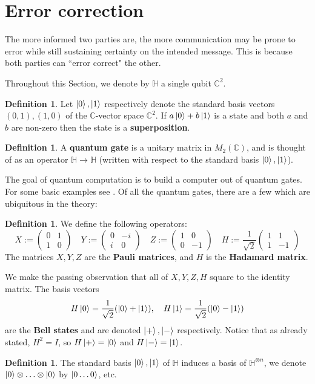 \documentclass[12pt]{article}
\theoremstyle{plain}
\theoremstyle{definition}
\newtheorem{defn}[thm]{Definition} %
\newcommand{\bb}[1]{\mathbb{#1}}
\newcommand{\lto}{\longrightarrow}
\begin{document}
	\section{Error correction}
	The more informed two parties are, the more communication may be prone to error while still sustaining certainty on the intended message. This is because both parties can ``error correct" the other.
	
	Throughout this Section, we denote by $\bb{H}$ a single qubit $\bb{C}^2$.
	\begin{defn}
		Let $\ket{0}, \ket{1}$ respectively denote the standard basis vectors $(0,1),(1,0)$ of the $\bb{C}$-vector space $\bb{C}^2$. If $a\ket{0} + b\ket{1}$ is a state and both $a$ and $b$ are non-zero then the state is a \textbf{superposition}. 
	\end{defn}
	
	\begin{defn}
		A \textbf{quantum gate} is a unitary matrix in $M_2(\bb{C})$, and is thought of as an operator $\bb{H} \lto \bb{H}$ (written with respect to the standard basis $\ket{0},\ket{1}$).
	\end{defn}
	The goal of quantum computation is to build a computer out of quantum gates. For some basic examples see \cite[\S 4]{quantum_computing}. Of all the quantum gates, there are a few which are ubiquitous in the theory:
	\begin{defn}
		We define the following operators:
		\begin{equation}
			X :=
			\begin{pmatrix}
				0 &1\\
				1 &0
			\end{pmatrix}
			\quad
			Y :=
			\begin{pmatrix}
				0 & -i\\
				i & 0
			\end{pmatrix}
			\quad
			Z :=
			\begin{pmatrix}
				1 & 0\\
				0 & -1
			\end{pmatrix}
			\quad
			H :=
			\frac{1}{\sqrt{2}}
			\begin{pmatrix}
				1 & 1\\
				1 & -1
			\end{pmatrix}
		\end{equation}
		The matrices $X,Y,Z$ are the \textbf{Pauli matrices}, and $H$ is the \textbf{Hadamard matrix}.
	\end{defn}
	We make the passing observation that all of $X,Y,Z,H$ square to the identity matrix. The basis vectors
	\begin{equation}
		H\ket{0} = \frac{1}{\sqrt{2}}(\ket{0} + \ket{1}),\quad H\ket{1} = \frac{1}{\sqrt{2}}(\ket{0} - \ket{1})
	\end{equation}
	are the \textbf{Bell states} and are denoted $\ket{+},\ket{-}$ respectively. Notice that as already stated, $H^2 = I$, so $H\ket{+} = \ket{0}$ and $H\ket{-} = \ket{1}$.
	\begin{defn}
		The standard basis $\ket{0},\ket{1}$ of $\bb{H}$ induces a basis of $\bb{H}^{\otimes n}$, we denote $\ket{0} \otimes \hdots \otimes \ket{0}$ by $\ket{0\hdots 0}$, etc.
	\end{defn}
	
\end{document}

